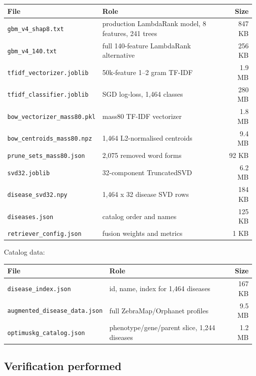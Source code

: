 \documentclass[11pt,a4paper]{article}
\newcommand{\code}[1]{\texttt{\small #1}}
\begin{document}
\begin{center}
\begin{longtable}{llr}
\toprule
File & Role & Size\\
\midrule
\code{gbm\_v4\_shap8.txt} & production LambdaRank model, 8 features, 241 trees & 847 KB\\
\code{gbm\_v4\_140.txt} & full 140-feature LambdaRank alternative & 256 KB\\
\code{tfidf\_vectorizer.joblib} & 50k-feature 1--2 gram TF-IDF & 1.9 MB\\
\code{tfidf\_classifier.joblib} & SGD log-loss, 1,464 classes & 280 MB\\
\code{bow\_vectorizer\_mass80.pkl} & mass80 TF-IDF vectorizer & 1.8 MB\\
\code{bow\_centroids\_mass80.npz} & 1,464 L2-normalised centroids & 9.4 MB\\
\code{prune\_sets\_mass80.json} & 2,075 removed word forms & 92 KB\\
\code{svd32.joblib} & 32-component TruncatedSVD & 6.2 MB\\
\code{disease\_svd32.npy} & 1,464 x 32 disease SVD rows & 184 KB\\
\code{diseases.json} & catalog order and names & 125 KB\\
\code{retriever\_config.json} & fusion weights and metrics & 1 KB\\
\bottomrule
\end{longtable}
\end{center}

Catalog data:
\begin{center}
\begin{tabular}{llr}
\toprule
File & Role & Size\\
\midrule
\code{disease\_index.json} & id, name, index for 1,464 diseases & 167 KB\\
\code{augmented\_disease\_data.json} & full ZebraMap/Orphanet profiles & 9.5 MB\\
\code{optimuskg\_catalog.json} & phenotype/gene/parent slice, 1,244 diseases & 1.2 MB\\
\bottomrule
\end{tabular}
\end{center}

\subsection{Verification performed}
\end{document}
